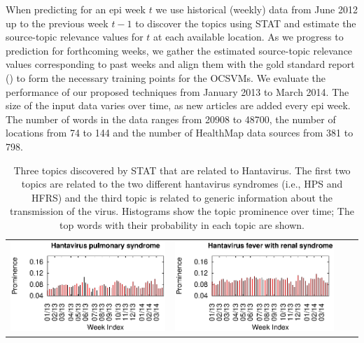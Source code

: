 \documentclass[conference]{IEEEtran}
\newcommand{\model}{{STAT}\xspace} %
\begin{document}
When predicting for an epi week $t$ we use historical (weekly) data from June 2012 up to the previous week $t-1$ to discover the topics using \model and estimate the source-topic relevance values for $t$ at each available location. As we progress to prediction for forthcoming weeks, we gather the estimated source-topic relevance values corresponding to past weeks and align them with the gold standard report () to  form the necessary training points for the OCSVMs. We evaluate the performance of our proposed techniques from January 2013 to March 2014. The size of the input data varies over time, as new articles are added every epi week. The number of words in the data ranges from 20908 to 48700, the number of locations from 74 to 144 and the number of HealthMap data sources from 381 to 798.

\begin{table}[t]
\begin{center}
\caption{Three topics discovered by \model that are related to Hantavirus. The first two topics are related to the two different hantavirus syndromes (i.e., HPS and HFRS) and the third topic is related to generic information about the  transmission of the virus. Histograms show the topic prominence over time; The top words with their probability in each topic are shown.}
\begin{tabular}{|lr|lr|lr|}
\hline
\multicolumn{2}{|c|}{\includegraphics[clip,scale=0.45]{fig/topic_hanta_timeline.eps}} & \multicolumn{2}{|c|}{\includegraphics[clip,scale=0.45]{fig/topic_hanta3_timeline.eps}}& 

\end{tabular}
\end{center}
\end{table}
\end{document}
